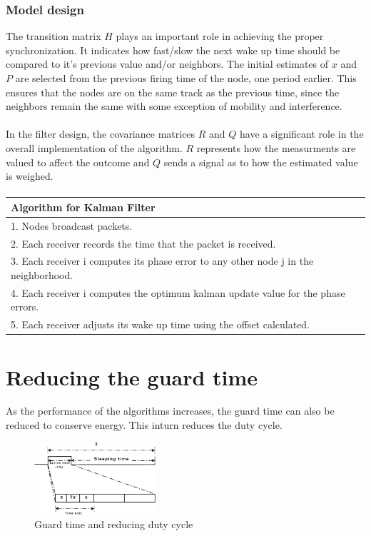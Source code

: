 \documentclass[a4paper,10pt]{report}
\begin{document}
\subsubsection{Model design}
The transition matrix $H$ plays an important role in achieving the proper synchronization. It indicates how fast/slow the next wake up time should be compared to it's previous value and/or neighbors. The initial estimates of $x$ and $P$ are selected from the previous firing time of the node, one period earlier. This ensures that the nodes are on the same track as the previous time, since the neighbors remain the same with some exception of mobility and interference. \paragraph*{}
In the filter design, the covariance matrices $R$ and $Q$ have a significant
role in the overall implementation of the algorithm. $R$ represents how
 the measurments are valued to affect the outcome and $Q$
sends a signal as to how the estimated value is weighed.
\paragraph*{}
\begin{tabular}{  l }Algorithm for Kalman Filter \\ \hline \hline
1. Nodes broadcast packets. \\  2. Each receiver records the time that the packet is received. \\
3. Each receiver i computes its phase error to any other node j in the neighborhood. \\
4. Each receiver i computes the optimum kalman update value for the phase errors. \\
5. Each receiver adjusts its wake up time using the offset calculated.\\
\hline \hline
\end{tabular}
\section{\textbf{Reducing the guard time}}
As the performance of the algorithms increases, the guard time can also be reduced to conserve energy. This inturn
reduces the duty cycle.
\begin{figure}
\centering
\includegraphics[width=0.4\textwidth]{guardtimesaving}
\caption{Guard time and reducing duty cycle} \label{guardtimesaving}
\end{figure}
\end{document}
